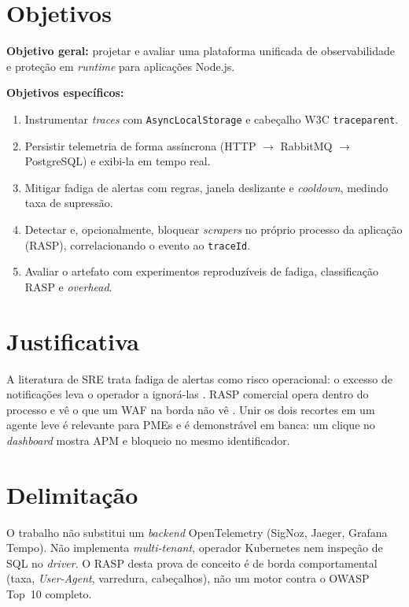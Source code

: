 \documentclass[
  12pt,
  oneside,
  a4paper,
  english,
  brazil,
  sumario=tradicional
]{abntex2}
\begin{document}
\section{Objetivos}

\textbf{Objetivo geral:} projetar e avaliar uma plataforma unificada de observabilidade e proteção em \textit{runtime} para aplicações Node.js.

\textbf{Objetivos específicos:}

\begin{enumerate}
  \item Instrumentar \textit{traces} com \texttt{AsyncLocalStorage} e cabeçalho W3C \texttt{traceparent}.
  \item Persistir telemetria de forma assíncrona (HTTP $\rightarrow$ RabbitMQ $\rightarrow$ PostgreSQL) e exibi-la em tempo real.
  \item Mitigar fadiga de alertas com regras, janela deslizante e \textit{cooldown}, medindo taxa de supressão.
  \item Detectar e, opcionalmente, bloquear \textit{scrapers} no próprio processo da aplicação (RASP), correlacionando o evento ao \texttt{traceId}.
  \item Avaliar o artefato com experimentos reproduzíveis de fadiga, classificação RASP e \textit{overhead}.
\end{enumerate}

\section{Justificativa}

A literatura de SRE trata fadiga de alertas como risco operacional: o excesso de notificações leva o operador a ignorá-las \cite{beyer2016sre}. RASP comercial opera dentro do processo e vê o que um WAF na borda não vê \cite{impervaRasp}. Unir os dois recortes em um agente leve é relevante para PMEs e é demonstrável em banca: um clique no \textit{dashboard} mostra APM e bloqueio no mesmo identificador.

\section{Delimitação}

O trabalho não substitui um \textit{backend} OpenTelemetry (SigNoz, Jaeger, Grafana Tempo). Não implementa \textit{multi-tenant}, operador Kubernetes nem inspeção de SQL no \textit{driver}. O RASP desta prova de conceito é de borda comportamental (taxa, \textit{User-Agent}, varredura, cabeçalhos), não um motor contra o OWASP Top~10 completo.
\end{document}
